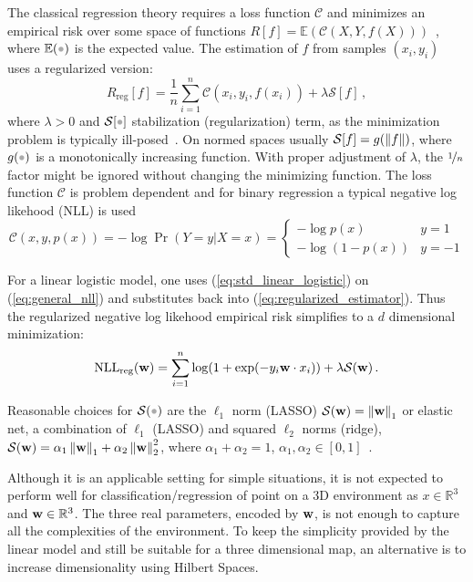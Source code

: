 The classical regression theory requires a loss function $\mathscr{C}$ and
minimizes an empirical risk over some space of functions
$R[f]=\mathbb{E}(\mathscr{C}(X,Y,f(X)))$~\cite{jaakkola1999probabilistic},
where $\mathbb{E}(\parm)$ is the expected value.
The estimation of $f$ from samples $(x_i,y_i)$ uses a regularized version:
\begin{equation}
\label{eq:regularized_estimator}
R_{\text{reg}}[f] =
\frac{1}{n}\sum_{i=1}^n\mathscr{C}(x_i,y_i,f(x_i))+\lambda\mathcal{S}[f]\,,
\end{equation}
%
where $\lambda>0$ and $\mathcal{S}[\parm]$ stabilization (regularization) term,
as the minimization problem is typically
ill-posed~\cite{jaakkola1999probabilistic}. On normed spaces usually
$\mathcal{S}[f]=g(\left\lVert f\right\rVert)$, where $g(\parm)$ is a monotonically increasing
function. With proper adjustment of $\lambda$, the $\nicefrac{1}{n}$ factor
might be ignored without changing the minimizing function.
The loss function $\mathscr{C}$ is problem dependent and for binary regression a
typical negative log likehood (NLL) is used
\begin{equation}
\label{eq:general_nll}
\mathscr{C}(x,y,p(x)) = - \log \Pr(Y=y|X=x) = 
\begin{cases} 
      - \log p(x) & y=1 \\
      - \log (1-p(x)) & y=-1
   \end{cases}
\end{equation}

For a linear logistic model, one uses (\ref{eq:std_linear_logistic}) on
(\ref{eq:general_nll}) and substitutes back into
(\ref{eq:regularized_estimator}).
Thus the regularized negative log likehood empirical risk simplifies to a $d$
dimensional minimization:
\begin{equation}
\label{eq:classicnll}
\text{NLL}_{\text{reg}}(\mathrm{\mathbf{w}}) =  \sum_{i=1}^n \log(1+\exp(-y_i
\mathrm{\mathbf{w}}\cdot x_i)) +\lambda\mathcal{S}(\mathrm{\mathbf{w}})\,.
\end{equation}


Reasonable choices for $\mathcal{S}(\parm)$
are the $\ell_1$ norm (LASSO)
$\mathcal{S}(\mathrm{\mathbf{w}})=\left\lVert\mathrm{\mathbf{w}}\right\rVert_1$
or elastic net, a combination of $\ell_1$ (LASSO) and
squared $\ell_2$ norms (ridge),
$\mathcal{S}(\mathrm{\mathbf{w}})=\alpha_1\left\lVert\mathrm{\mathbf{w}}\right\rVert_1
+\alpha_2\left\lVert\mathrm{\mathbf{w}}\right\rVert_2^2$, where
$\alpha_1+\alpha_2=1$, $\alpha_1,\alpha_2\in[0,1]$~\cite{hastie2015statistical}.


Although it is an applicable setting for simple situations, it is not expected
to perform well for classification/regression of point on a 3D environment as
$x\in\mathbb{R}^3$ and $\mathrm{\mathbf{w}}\in\mathbb{R}^3$. The three real parameters,
encoded by $\mathrm{\mathbf{w}}$, is not enough to capture all the complexities of the
environment. To keep the simplicity provided by the linear model and still be
suitable for a three dimensional map, an alternative is to increase
dimensionality using Hilbert Spaces.

